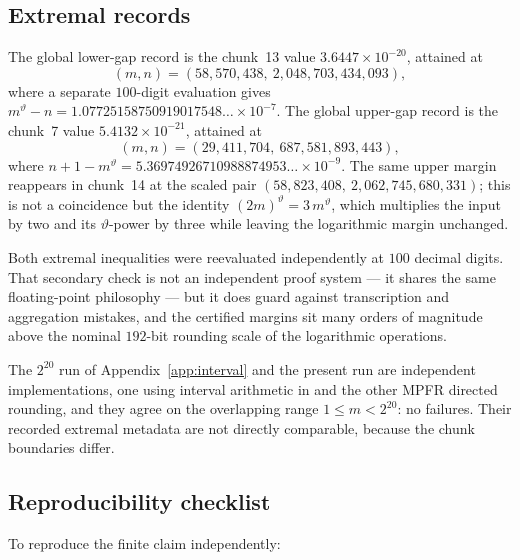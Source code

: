 \documentclass[11pt,oneside]{article}
\theoremstyle{definition}
\theoremstyle{remark}
\newcommand{\thetaq}{\vartheta}
\newcommand{\lean}[1]{\texttt{\detokenize{#1}}}
\begin{document}
\subsection{Extremal records}
\label{a3:records}

The global lower-gap record is the chunk~13 value $3.6447\times10^{-20}$, attained at
\[
  (m,n)=(58{,}570{,}438,\ 2{,}048{,}703{,}434{,}093),
\]
where a separate $100$-digit evaluation gives
$m^{\thetaq}-n=1.07725158750919017548\ldots\times10^{-7}$.  The global upper-gap record is
the chunk~7 value $5.4132\times10^{-21}$, attained at
\[
  (m,n)=(29{,}411{,}704,\ 687{,}581{,}893{,}443),
\]
where $n+1-m^{\thetaq}=5.36974926710988874953\ldots\times10^{-9}$.  The same upper margin
reappears in chunk~14 at the scaled pair $(58{,}823{,}408,\ 2{,}062{,}745{,}680{,}331)$; this
is not a coincidence but the identity $(2m)^{\thetaq}=3\,m^{\thetaq}$, which multiplies the
input by two and its $\thetaq$-power by three while leaving the logarithmic margin unchanged.

Both extremal inequalities were reevaluated independently at $100$ decimal digits.  That
secondary check is not an independent proof system --- it shares the same floating-point
philosophy --- but it does guard against transcription and aggregation mistakes, and the
certified margins sit many orders of magnitude above the nominal $192$-bit rounding scale of
the logarithmic operations.

The $2^{20}$ run of Appendix~\ref{app:interval} and the present run are independent
implementations, one using interval arithmetic in \lean{mpmath} and the other MPFR directed
rounding, and they agree on the overlapping range $1\le m<2^{20}$: no failures.  Their
recorded extremal metadata are not directly comparable, because the chunk boundaries differ.

\subsection{Reproducibility checklist}
\label{a3:checklist}

To reproduce the finite claim independently:
\end{document}
